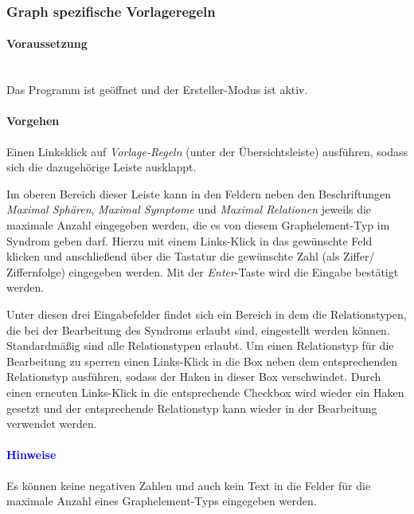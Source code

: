 \documentclass[enabledeprecatedfontcommands,fontsize=11pt,paper=a4,twoside]{scrartcl}
\newcounter{one}
\newcounter{two}[one]
\newcommand*{\hint}{\paragraph{\textcolor{blue}{Hinweise}}}
\newcommand*{\condition}{\paragraph{Voraussetzung}$\;$ \vspace{0.2cm}\\}
\newcommand*{\action}{\paragraph{Vorgehen}}
\let\tempone\itemize
\let\temptwo\enditemize
\renewenvironment{itemize}{\tempone\addtolength{\itemsep}{-10.0pt}}{\temptwo}
\let\origenumerate\enumerate
\let\origendenumerate\endenumerate
\renewenvironment{enumerate}{\origenumerate \addtolength{\itemsep}{-10.0pt}}{\origendenumerate}
\begin{document}
\subsubsection{Graph spezifische Vorlageregeln}
	\condition 
		Das Programm ist geöffnet und der Ersteller-Modus ist aktiv.
	\action
	\begin{enumerate}
		\item Einen Linksklick auf \textit{Vorlage-Regeln} (unter der Übersichtsleiste) ausführen, sodass sich die dazugehörige Leiste ausklappt.
		\item Im oberen Bereich dieser Leiste kann in den Feldern neben den Beschriftungen \textit{Maximal Sphären}, \textit{Maximal Symptome} und \textit{Maximal Relationen} jeweils die maximale Anzahl eingegeben werden, die es von diesem Graphelement-Typ im Syndrom geben darf. Hierzu mit einem Links-Klick in das gewünschte Feld klicken und anschließend über die Tastatur die gewünschte Zahl (als Ziffer/ Ziffernfolge) eingegeben werden. Mit der \textit{Enter}-Taste wird die Eingabe bestätigt werden.
		\item Unter diesen drei Eingabefelder findet sich ein Bereich in dem die Relationstypen, die bei der Bearbeitung des Syndroms erlaubt sind, eingestellt werden können. Standardmäßig sind alle Relationstypen erlaubt. Um einen Relationstyp für die Bearbeitung zu sperren einen Links-Klick in die Box neben dem entsprechenden Relationstyp ausführen, sodass der Haken in dieser Box verschwindet. Durch einen erneuten Links-Klick in die entsprechende Checkbox wird wieder ein Haken gesetzt und der entsprechende Relationstyp kann wieder in der Bearbeitung verwendet werden.
	\end{enumerate} 
	\hint
	\begin{itemize}
		\item Es können keine negativen Zahlen und auch kein Text in die Felder für die maximale Anzahl eines Graphelement-Typs eingegeben werden. \\
	\end{itemize}
\end{document}

